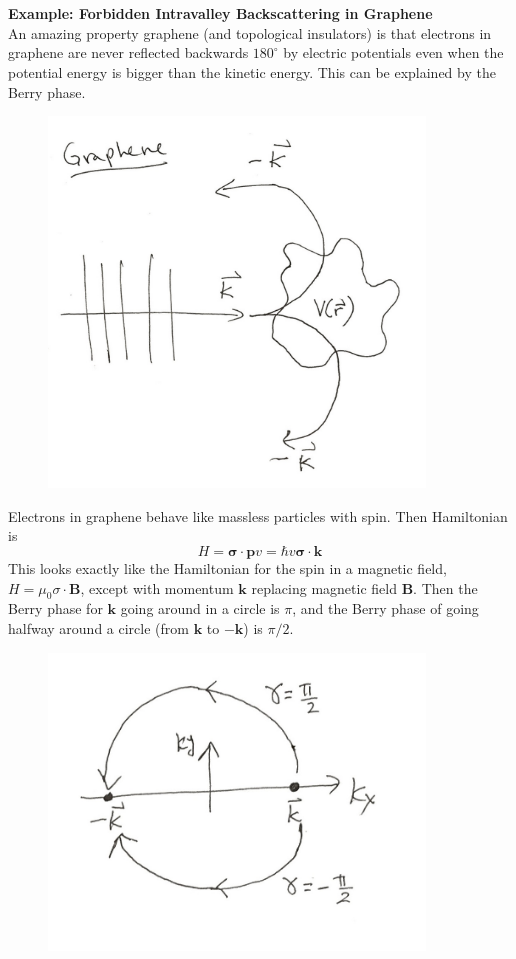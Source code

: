 \documentclass[a4paper,12pt]{article}
\renewcommand{\vec}[1]{\boldsymbol{\mathbf{#1}}}
\begin{document}
\\ \\
\textbf{Example: Forbidden Intravalley Backscattering in Graphene} \\
An amazing property graphene (and topological insulators) is that electrons in graphene are never reflected backwards $180^{\circ}$ by electric potentials even when the potential energy is bigger than the kinetic energy.  This can be explained by the Berry phase.
\begin{figure}[h!]
\centering
\includegraphics[width=100mm,keepaspectratio=true]{backscatter.jpg}
\end{figure}

Electrons in graphene behave like massless particles with spin. Then Hamiltonian is
\begin{equation}
H=\vec{\sigma} \cdot \vec{p} v = \hbar v \vec{\sigma} \cdot \vec{k}
\end{equation}
This looks exactly like the Hamiltonian for the spin in a magnetic field, $H = \mu_0 \sigma \cdot \vec{B}$, except with momentum $\vec{k}$ replacing magnetic field $\vec{B}$.  Then the Berry phase for $\vec{k}$ going around in a circle is $\pi$, and the Berry phase of going halfway around a circle (from $\vec{k}$ to $-\vec{k}$) is $\pi/2$.
\begin{figure}[h!]
\centering
\includegraphics[width=100mm,keepaspectratio=true]{kspace.jpg}
\end{figure}
\end{document}
